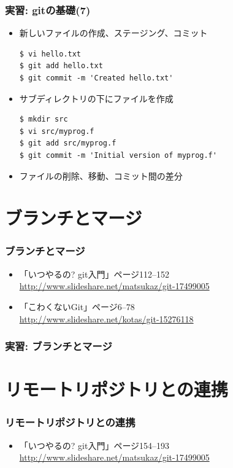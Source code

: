 \begin{frame}[t,fragile]
  \frametitle{実習: gitの基礎(7)}
  \begin{itemize}
  \item 新しいファイルの作成、ステージング、コミット
\begin{lstlisting}
$ vi hello.txt
$ git add hello.txt
$ git commit -m 'Created hello.txt'
\end{lstlisting}
  \item サブディレクトリの下にファイルを作成
\begin{lstlisting}
$ mkdir src
$ vi src/myprog.f
$ git add src/myprog.f
$ git commit -m 'Initial version of myprog.f'
\end{lstlisting}
  \item ファイルの削除、移動、コミット間の差分
  \end{itemize}
\end{frame}

\section{ブランチとマージ}

\begin{frame}
  \frametitle{ブランチとマージ}
  \begin{itemize}
  \item 「いつやるの? git入門」ページ112--152 \\
    \url{http://www.slideshare.net/matsukaz/git-17499005}
  \item 「こわくないGit」ページ6--78 \\
    \url{http://www.slideshare.net/kotas/git-15276118}
  \end{itemize}
\end{frame}

\begin{frame}
  \frametitle{実習: ブランチとマージ}
\end{frame}

\section{リモートリポジトリとの連携}

\begin{frame}
  \frametitle{リモートリポジトリとの連携}
  \begin{itemize}
  \item 「いつやるの? git入門」ページ154--193 \\
    \url{http://www.slideshare.net/matsukaz/git-17499005}
  \end{itemize}
\end{frame}

